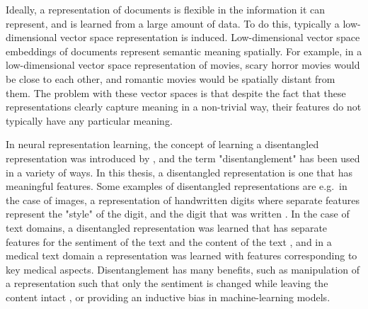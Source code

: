 
Ideally, a representation  of documents   is flexible in the information it can represent, and is learned from a large amount of data. To do this, typically a low-dimensional vector space representation is induced. Low-dimensional vector space embeddings of documents represent semantic meaning spatially. For example, in a low-dimensional vector space representation of movies,  scary horror movies would be close to each other, and romantic movies  would be spatially distant from them.  The problem with these vector spaces is that despite the fact that these representations clearly capture meaning in a non-trivial way,  their features do not typically have any particular meaning. 





 
%



%

 In neural representation learning, the concept of learning a disentangled representation was introduced by \cite{Bengio2012}, and the term "disentanglement" has been used in a variety of ways. In this thesis, a disentangled representation is one that has meaningful features. Some examples of disentangled representations are e.g.\ in the case of images, a representation of handwritten digits where separate  features represent the  "style" of the digit, and the  digit that was written \cite{Chen2016}. In the case of text domains, a disentangled representation was learned that  has  separate features for the sentiment of the text and the  content  of the text  \cite{John2019}, and in a medical text domain a representation was  learned with features corresponding to key medical aspects\cite{Banner}. Disentanglement has many benefits, such as manipulation of a representation such that only the  sentiment is changed while leaving the content intact \cite{Larsson2017}, or providing an inductive bias in machine-learning models.


